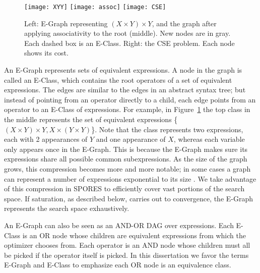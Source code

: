 \begin{figure}
\centering
    \texttt{[image: XYY]} \qquad \texttt{[image: assoc]} \qquad 
\texttt{[image: CSE]} 
    \vspace{7pt}
    \caption{Left: E-Graph representing $(X \times Y) \times Y$, and the graph after applying
      associativity to the root (middle). New nodes are in gray. Each dashed box is an E-Class.
      Right: the CSE problem. Each node shows its cost.}
    \label{assoc}
    \vspace{10pt}
\end{figure}

An E-Graph represents sets of equivalent expressions. A node in the graph is
called an E-Class, which contains the root operators of a set of equivalent
expressions. The edges are similar to the edges in an abstract syntax tree; but
instead of pointing from an operator directly to a child, each edge points from
an operator to an E-Class of expressions. For example, in Figure~\ref{assoc} the
top class in the middle represents the set of equivalent expressions \{$(X\times Y)\times Y,
X\times (Y\times Y)$\}. Note that the class represents two expressions, each with 2
appearances of $Y$ and one appearance of $X$, whereas each variable only appears
once in the E-Graph. This is because the E-Graph makes sure its expressions share
all possible common subexpressions. As the size of the graph grows, this
compression becomes more and more notable; in some cases a graph can 
represent a number of expressions exponential to its
size \cite{DBLP:journals/corr/abs-1012-1802}. We take advantage of this
compression in SPORES to efficiently cover vast portions of the search
space. If saturation, as described below, carries out to convergence, the E-Graph represents the search space exhaustively. 

An E-Graph can also be seen as an AND-OR DAG over expressions. Each E-Class is an OR node whose children are equivalent expressions from
which the optimizer chooses from. Each operator is an AND node whose children must all be picked if the operator itself is picked. In this dissertation we favor the terms E-Graph and E-Class to emphasize each OR node is an equivalence class. 

